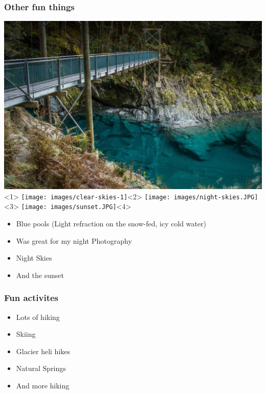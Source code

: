 \documentclass[12pt]{beamer}
\begin{document}
        \begin{frame}
            \frametitle{Other fun things}
                \begin{center}
                    \includegraphics[height=0.5\textheight]{images/blue-pools-1.png}<1>
                    \texttt{[image: images/clear-skies-1]}<2>
                    \texttt{[image: images/night-skies.JPG]}<3>
                    \texttt{[image: images/sunset.JPG]}<4>
                \end{center}
            
                \begin{itemize}
                    \item Blue pools (Light refraction on the snow-fed, icy cold water)
                    \pause
                    \item Was great for my night Photography
                    \pause
                    \item Night Skies
                    \pause
                    \item And the sunset
                \end{itemize}
        \end{frame}

        \begin{frame}
            \frametitle{Fun activites}
                \begin{itemize}
                    \item Lots of hiking
                    \pause
                    \item Skiing
                    \pause
                    \item Glacier heli hikes
                    \pause
                    \item Natural Springs
                    \pause
                    \item And more hiking
                \end{itemize}
        \end{frame}
\end{document}
